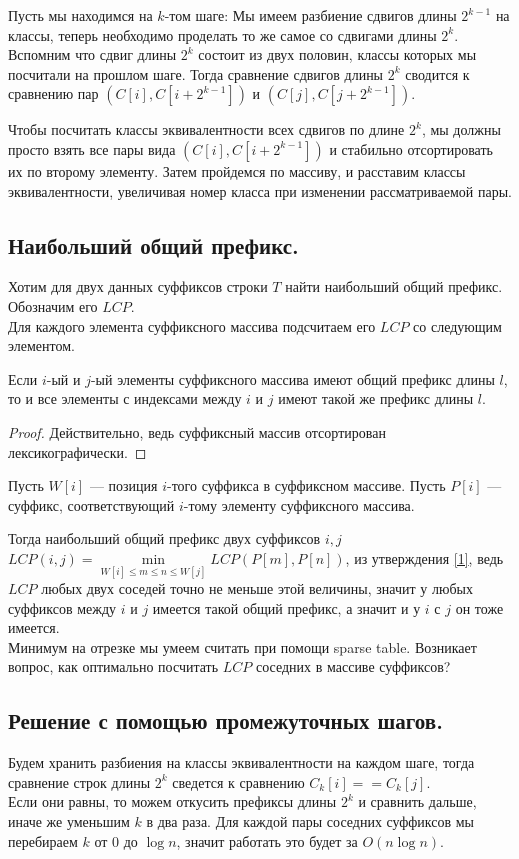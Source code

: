 Пусть мы находимся на $k$-том шаге:
Мы имеем разбиение сдвигов длины $2 ^ {k - 1}$ на классы, теперь необходимо проделать то же самое со сдвигами длины  $2 ^ k$.
Вспомним что сдвиг длины $2 ^ k$ состоит из двух половин, классы которых мы посчитали на прошлом шаге. Тогда сравнение сдвигов длины  $2 ^ k$ сводится к сравнению пар $(C[i], C[i + 2 ^ {k - 1}])$ и $(C[j], C[j + 2 ^ {k - 1}])$.

Чтобы посчитать классы эквивалентности всех сдвигов по длине $2 ^ k$, мы должны просто взять все пары вида $(C[i], C[i + 2 ^ {k - 1}])$ и стабильно отсортировать их по второму элементу. 
Затем пройдемся по массиву, и расставим классы эквивалентности, увеличивая номер класса при изменении рассматриваемой пары. 

\subsection{Наибольший общий префикс.}
Хотим для двух данных суффиксов строки $T$ найти наибольший общий префикс. Обозначим его  $LCP$. \\
Для каждого элемента суффиксного массива подсчитаем его $LCP$ со следующим элементом.

\begin{prop}\label{1}
    Если $i$-ый и  $j$-ый элементы суффиксного массива имеют общий префикс длины  $l$, то и все элементы с индексами между  $i$ и  $j$ имеют такой же префикс длины  $l$.
\end{prop}

\begin{proof}
    Действительно, ведь суффиксный массив отсортирован лексикографически.
\end{proof}

Пусть $W[i]$ --- позиция  $i$-того суффикса в суффиксном массиве.
Пусть $P[i]$ --- суффикс, соответствующий  $i$-тому элементу суффиксного массива.

Тогда наибольший общий префикс двух суффиксов $i, j$ $LCP(i, j) = \min \limits_{W[i] \leq m \leq n \leq W[j]} LCP(P[m], P[n])$, из утверждения \ref{1}, ведь $LCP$ 
любых двух соседей точно не меньше этой величины, значит у любых суффиксов между  $i$ и  $j$ имеется такой общий префикс, а значит и у  $i$ с  $j$ он тоже имеется.
\\
Минимум на отрезке мы умеем считать при помощи sparse table.
Возникает вопрос, как оптимально посчитать $LCP$ соседних в массиве суффиксов?

\subsection{Решение с помощью промежуточных шагов.}
Будем хранить разбиения на классы эквивалентности на каждом шаге, тогда сравнение строк длины $2^k$ сведется к сравнению  $C_k[i] == C_k[j]$. \\
Если они равны, то можем откусить префиксы длины $2^k$ и сравнить дальше, иначе же уменьшим $k$ в два раза.
Для каждой пары соседних суффиксов мы перебираем  $k$ от  $0$ до $\log{n}$, значит работать это будет за  $O(n\log{n})$.

